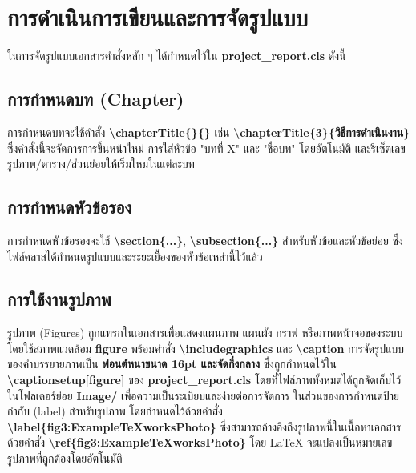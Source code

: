 \section{การดำเนินการเขียนและการจัดรูปแบบ}
\hspace*{1.5em} %
ในการจัดรูปแบบเอกสารคำสั่งหลัก ๆ ได้กำหนดไว้ใน \textbf{project\_report.cls} ดังนี้

\subsection{การกำหนดบท (Chapter)}
\hspace*{1.5em} %
การกำหนดบทจะใช้คำสั่ง \textbf{\textbackslash chapterTitle\{<Chapter Number>\}\{<Chapter Title>\}} เช่น \textbf{\textbackslash chapterTitle\{3\}\{วิธีการดำเนินงาน\}} ซึ่งคำสั่งนี้จะจัดการการขึ้นหน้าใหม่ การใส่หัวข้อ "บทที่ X" และ "ชื่อบท" โดยอัตโนมัติ และรีเซ็ตเลขรูปภาพ/ตาราง/ส่วนย่อยให้เริ่มใหม่ในแต่ละบท

\subsection{การกำหนดหัวข้อรอง}
\hspace*{1.5em} %
การกำหนดหัวข้อรองจะใช้ \textbf{\textbackslash section\{...\}}, \textbf{\textbackslash subsection\{...\}} สำหรับหัวข้อและหัวข้อย่อย ซึ่งไฟล์คลาสได้กำหนดรูปแบบและระยะเยื้องของหัวข้อเหล่านี้ไว้แล้ว

\subsection{การใช้งานรูปภาพ}
\hspace*{1.5em} %
รูปภาพ (Figures) ถูกแทรกในเอกสารเพื่อแสดงแผนภาพ แผนผัง กราฟ หรือภาพหน้าจอของระบบ โดยใช้สภาพแวดล้อม \textbf{figure} พร้อมคำสั่ง \textbf{\textbackslash includegraphics} และ \textbf{\textbackslash caption} การจัดรูปแบบของคำบรรยายภาพเป็น \textbf{ฟอนต์หนาขนาด 16pt และจัดกึ่งกลาง} ซึ่งถูกกำหนดไว้ใน \textbf{\textbackslash captionsetup[figure]} ของ \textbf{project\_report.cls} โดยที่ไฟล์ภาพทั้งหมดได้ถูกจัดเก็บไว้ในโฟลเดอร์ย่อย \textbf{Image/} เพื่อความเป็นระเบียบและง่ายต่อการจัดการ ในส่วนของการกำหนดป้ายกำกับ (label) สำหรับรูปภาพ โดยกำหนดไว้ด้วยคำสั่ง \textbf{\textbackslash label\{fig3:ExampleTeXworksPhoto\}} ซึ่งสามารถอ้างอิงถึงรูปภาพนี้ในเนื้อหาเอกสารด้วยคำสั่ง \textbf{\textbackslash ref\{fig3:ExampleTeXworksPhoto\}} โดย LaTeX จะแปลงเป็นหมายเลขรูปภาพที่ถูกต้องโดยอัตโนมัติ

\begin{figure}[htbp]
\centering
{}
\caption{}
\label{fig3:ExampleTeXworksPhoto}
\end{figure}

